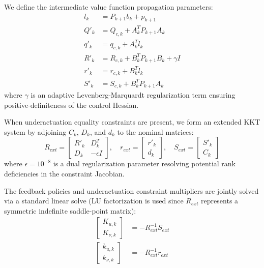 \documentclass[11pt]{article}
\begin{document}
We define the intermediate value function propagation parameters:
\begin{align}
    l_k &= P_{k+1} b_k + p_{k+1} \\
    Q'_k &= Q_{c, k} + A_k^T P_{k+1} A_k \\
    q'_k &= q_{c, k} + A_k^T l_k \\
    R'_k &= R_{c, k} + B_k^T P_{k+1} B_k + \gamma I \\
    r'_k &= r_{c, k} + B_k^T l_k \\
    S'_k &= S_{c, k} + B_k^T P_{k+1} A_k
\end{align}
where $\gamma$ is an adaptive Levenberg-Marquardt regularization term ensuring positive-definiteness of the control Hessian.

When underactuation equality constraints are present, we form an extended KKT system by adjoining $C_k$, $D_k$, and $d_k$ to the nominal matrices:
\begin{equation}
    R_{ext} = \begin{bmatrix} R'_k & D_k^T \\ D_k & -\epsilon I \end{bmatrix}, \quad
    r_{ext} = \begin{bmatrix} r'_k \\ d_k \end{bmatrix}, \quad
    S_{ext} = \begin{bmatrix} S'_k \\ C_k \end{bmatrix}
\end{equation}
where $\epsilon = 10^{-8}$ is a dual regularization parameter resolving potential rank deficiencies in the constraint Jacobian.

The feedback policies and underactuation constraint multipliers are jointly solved via a standard linear solve (LU factorization is used since $R_{ext}$ represents a symmetric indefinite saddle-point matrix):
\begin{align}
    \begin{bmatrix} K_{u, k} \\ K_{\nu, k} \end{bmatrix} &= - R_{ext}^{-1} S_{ext} \\
    \begin{bmatrix} k_{u, k} \\ k_{\nu, k} \end{bmatrix} &= - R_{ext}^{-1} r_{ext}
\end{align}
\end{document}
